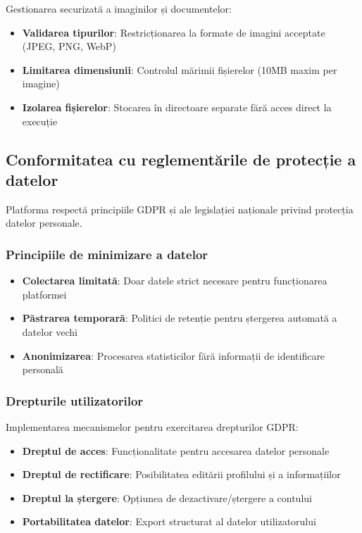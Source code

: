 \documentclass[12pt,a4paper]{report}
\begin{document}
Gestionarea securizată a imaginilor și documentelor:

\begin{itemize}
    \item \textbf{Validarea tipurilor}: Restricționarea la formate de imagini acceptate (JPEG, PNG, WebP)
    \item \textbf{Limitarea dimensiunii}: Controlul mărimii fișierelor (10MB maxim per imagine)
    \item \textbf{Izolarea fișierelor}: Stocarea în directoare separate fără acces direct la execuție
\end{itemize}

\subsection{Conformitatea cu reglementările de protecție a datelor}

Platforma respectă principiile GDPR și ale legislației naționale privind protecția datelor personale.

\subsubsection{Principiile de minimizare a datelor}

\begin{itemize}
    \item \textbf{Colectarea limitată}: Doar datele strict necesare pentru funcționarea platformei
    \item \textbf{Păstrarea temporară}: Politici de retenție pentru ștergerea automată a datelor vechi
    \item \textbf{Anonimizarea}: Procesarea statisticilor fără informații de identificare personală
\end{itemize}

\subsubsection{Drepturile utilizatorilor}

Implementarea mecanismelor pentru exercitarea drepturilor GDPR:

\begin{itemize}
    \item \textbf{Dreptul de acces}: Funcționalitate pentru accesarea datelor personale
    \item \textbf{Dreptul de rectificare}: Posibilitatea editării profilului și a informațiilor
    \item \textbf{Dreptul la ștergere}: Opțiunea de dezactivare/ștergere a contului
    \item \textbf{Portabilitatea datelor}: Export structurat al datelor utilizatorului
\end{itemize}
\end{document}
